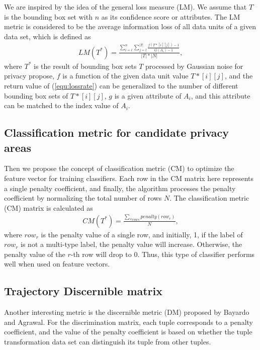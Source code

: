 \documentclass[trans]{IEEEtran}
\newcommand{\el}[1]{{\color{black}#1}}
\begin{document}
\el{ We are inspired by the idea of the general loss measure (LM)\cite{iyengar2002transforming}. We assume that $T$ is the bounding box set with $n$ as its confidence score or attributes. The LM metric is considered to be the average information loss of all data units of a given data set, which is defined as
\begin{eqnarray}\label{LMformula}
LM(T^*)=\frac{\sum^{n}_{i=l} \sum^{|T|}_{j=l} \frac{f(T*[i][j])-1}{G(A_i)-1} }{|T|*|N|},
\end{eqnarray}
where $T^*$ is the result of bounding box sets $T$ processed by Gaussian noise for privacy propose, $f$ is a function of the given data unit value $ T * [i] [j] $, and the return value of (\ref{equ:lossrate}) can be generalized to the number of different bounding box sets of $ T * [i] [j] $, $g$ is a given attribute of $A_i$, and this attribute can be matched to the index value of $A_i$.}

\subsection{Classification metric for candidate privacy areas}
\el{ Then we propose the concept of classification metric (CM) to optimize the feature vector for training classifiers. Each row in the CM matrix here represents a single penalty coefficient, and finally, the algorithm processes the penalty coefficient by normalizing the total number of rows $N$. The classification metric (CM) matrix is calculated as   
\begin{eqnarray}\label{CMformula}
CM(T^*)=\frac{\sum_{\forall rows} penalty(row_r) }{N},
\end{eqnarray}
where $row_r$ is the penalty value of a single row, and initially, 1, if the label of $row_r$ is not a multi-type label, the penalty value will increase. Otherwise, the penalty value of the $r$-th row will drop to 0.} Thus, this type of classifier performs well when used on feature vectors.

\subsection{Trajectory Discernible matrix}
\el{ Another interesting metric is the discernible metric (DM)\cite{bayardo2005data} proposed by Bayardo and Agrawal.} For the discrimination matrix, each tuple corresponds to a penalty coefficient, and the value of the penalty coefficient is based on whether the tuple transformation data set can distinguish its tuple from other tuples. 
\end{document}
